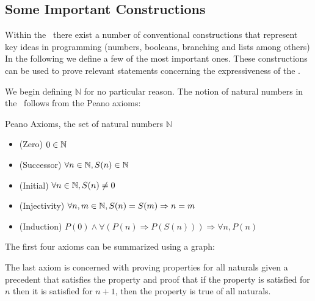 \documentclass[12pt]{book}
\begin{document}
\subsection{\centering Some Important Constructions}

Within the \lcalc \ there exist a number of conventional constructions that represent key ideas in programming (numbers, booleans, branching and lists among others) In the following we define a few of the most important ones. These constructions can be used to prove relevant statements concerning the expressiveness of the \lcalc.

We begin defining $ \mathbb{N} $ for no particular reason. The notion of natural numbers in the \lcalc \ follows from the Peano axioms:
\begin{definition} Peano Axioms, the set of natural numbers $\mathbb{N}$
\begin{itemize}
\item (Zero) \( 0 \in \mathbb{N} \)
\item (Successor) \( \forall n \in \mathbb{N}, S(n) \in \mathbb{N} \)
\item (Initial) \( \forall n \in \mathbb{N}, S(n) \neq 0 \) \label{def:peano-nat-initial}
\item (Injectivity) \( \forall n, m \in \mathbb{N}, S(n) = S(m) \Rightarrow n = m \)
\item (Induction) \( P(0) \land \forall ( P(n) \Rightarrow P(S(n))) \Rightarrow \forall n,  P (n) \)
\end{itemize}
The first four axioms can be summarized using a graph:
\begin{center}
\end{center}
The last axiom is concerned with proving properties for all naturals given a precedent that satisfies the property and proof that if the property is satisfied for $n$ then it is satisfied for $n+1$, then the property is true of all naturals.
\end{definition}
\end{document}
